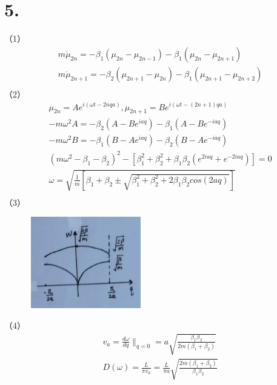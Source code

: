 \documentclass[UTF8]{ctexart}
\begin{document}
\section*{5.}
（1）
\begin{equation*}
    \begin{aligned}
        & m\ddot\mu_{2n}=-\beta_1(\mu_{2n}-\mu_{2n-1})-\beta_1(\mu_{2n}-\mu_{2n+1})\\
        & m\ddot\mu_{2n+1}=-\beta_2(\mu_{2n+1}-\mu_{2n})-\beta_1(\mu_{2n+1}-\mu_{2n+2})\\
    \end{aligned}
\end{equation*}
（2）
\begin{equation*}
    \begin{aligned}
        & \mu_{2n} = Ae^{i(\omega t-2nqa)}, \mu_{2n+1} = Be^{i(\omega t-(2n+1)qa)}\\
        & -m\omega^2A=-\beta_2(A-Be^{iaq})-\beta_1(A-Be^{-iaq})\\
        & -m\omega^2B=-\beta_1(B-Ae^{iaq})-\beta_2(B-Ae^{-iaq})\\
        & (m\omega^2 -\beta_1 -\beta_2)^2-[\beta_1^2+\beta_2^2+\beta_1\beta_2(e^{2iaq}+e^{-2iaq})]=0\\
        & \omega = \sqrt{\frac{1}{m}[\beta_1+\beta_2\pm\sqrt{\beta_1^2+\beta_2^2+2\beta_1\beta_2cos(2aq)}]}\\
    \end{aligned}
\end{equation*}
（3）
\begin{figure}[H]                                         
    \centering                                                
    \includegraphics[width=5cm,height=4cm]{ans-5-3.jpg}       
    \caption*{}                                                                              
    \end{figure}
（4）
\begin{equation*}
    \begin{aligned}
        & v_a = \frac{d\omega}{dq}\lVert_{q=0}=a\sqrt{\frac{\beta_1\beta_2}{2m(\beta_1+\beta_2)}}\\
        & D(\omega) = \frac{L}{\pi v_a}=\frac{L}{\pi a}\sqrt{\frac{2m(\beta_1+\beta_2)}{\beta_1\beta_2}}\\
    \end{aligned}
\end{equation*}
\end{document}
